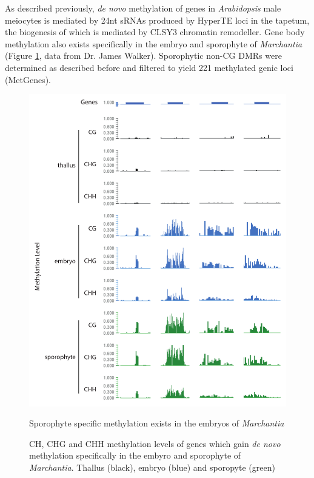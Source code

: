 As described previously, \textit{de novo} methylation of genes in \textit{Arabidopsis} male meiocytes is mediated by 24nt sRNAs produced by HyperTE loci in the tapetum, the biogenesis of which is mediated by CLSY3 chromatin remodeller. Gene body methylation also exists specifically in the embryo and sporophyte of \textit{Marchantia} (Figure \ref{fig:SLM_examples}, data from Dr. James Walker). Sporophytic non-CG DMRs were determined as described before\cite{jimmythesis} and filtered to yield 221 methylated genic loci (MetGenes).

\begin{figure}[htbp!] 
\centering    
    \includegraphics[width=1\textwidth]{Chapter3/Figs/Figure4_SLM_examples.pdf}
\caption{Sporophyte specific methylation exists in the embryos of \textit{Marchantia}}
\label{fig:SLM_examples}
\captionsetup{font=small}
    \caption*{CH, CHG and CHH methylation levels of genes which gain \textit{de novo} methylation specifically in the embyro and sporophyte of \textit{Marchantia}. Thallus (black), embryo (blue) and sporopyte (green)}
\end{figure}


